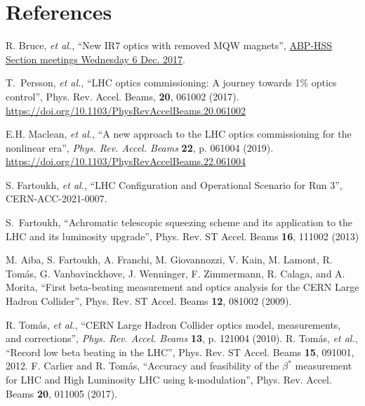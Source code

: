 \documentclass{cernatsnote}
\begin{document}
\section{References}
\begin{thebibliography}{99} %


 R. Bruce, {\it et al.}, ``New IR7 optics with removed MQW magnets'',  \href{https://indico.cern.ch/event/681507/contributions/2814548/attachments/1570845/2478033/2017.12.06--HSS_meeting_MQW_removal.pdf}{ABP-HSS Section meetings
Wednesday 6 Dec. 2017}.

 T.~Persson, {\it et al.}, ``LHC optics commissioning: A journey towards 1$\%$ optics control'', Phys. Rev. Accel. Beams, \textbf{20}, 061002 (2017).
\url{https://doi.org/10.1103/PhysRevAccelBeams.20.061002}

 E.H. Maclean, {\it et al.}, ``A new approach to the LHC optics commissioning for the nonlinear era'', {\it Phys. Rev. Accel. Beams}  {\bf 22}, p. 061004 (2019).\vspace{-0.03cm}
\url{https://doi.org/10.1103/PhysRevAccelBeams.22.061004}

 S. Fartoukh, {\it et al.}, 
	``LHC Configuration and Operational Scenario for Run 3'', CERN-ACC-2021-0007.
	
S.~Fartoukh, ``Achromatic telescopic squeezing scheme and its application to the LHC and its luminosity upgrade'', Phys. Rev. ST Accel. Beams {\bf16}, 111002 (2013)

 M. Aiba, S. Fartoukh, A. Franchi, M. Giovannozzi, V. Kain, M. Lamont, R. Tom\'as, G. Vanbavinckhove, J. Wenninger, F. Zimmermann, R. Calaga, and A. Morita, ``First beta-beating measurement and optics analysis for the CERN Large Hadron Collider'', Phys. Rev. ST Accel. Beams {\bf12}, 081002 (2009).


R. Tomás, {\it et al.}, “CERN Large Hadron Collider optics
model, measurements, and corrections”, {\it Phys. Rev. Accel. Beams}  {\bf 13}, p. 121004 (2010).
%
 R. Tom\'as, {\it et al.}, ``Record low beta beating in the LHC'',
Phys. Rev. ST Accel. Beams {\bf15}, 091001, 2012.
%
 F. Carlier and R. Tom\'as, ``Accuracy and feasibility of the $\beta^*$ measurement for LHC and High Luminosity LHC using k-modulation'',
Phys. Rev. Accel. Beams {\bf20}, 011005 (2017).
%


\end{thebibliography}
\end{document}
